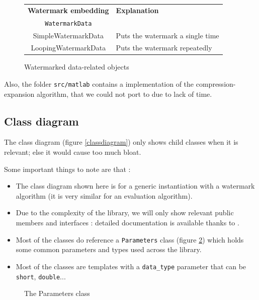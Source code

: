 \begin{figure}[h!]
\centering
\begin{tabular}{|c|l|}
\hline
\textbf{Watermark embedding} & \textbf{Explanation} \\
\texttt{WatermarkData} & \\
\hline
SimpleWatermarkData & Puts the watermark a single time \\   
LoopingWatermarkData & Puts the watermark repeatedly \\
\hline
\end{tabular}
\caption{Watermarked data-related objects}
\label{frameworkclass4}
\end{figure}

Also, the folder \texttt{src/matlab} contains a  implementation of the compression-expansion algorithm, that we could not port to  due to lack of time.

\newpage

\subsection{Class diagram}

The class diagram (figure \ref{classdiagram}) only shows child classes when it is relevant; else it would cause too much bloat.

Some important things to note are that :
\begin{itemize}
\item The class diagram shown here is for a generic instantiation with a watermark algorithm (it is very similar for an evaluation algorithm). 
\item Due to the complexity of the library, we will only show relevant public members and interfaces : detailed documentation is available thanks to .
\item Most of the classes do reference a \texttt{Parameters} class (figure \ref{parametersclass}) which holds some common parameters and types used across the library.
\item Most of the classes are templates with a \texttt{data\_type} parameter that can be \texttt{short}, \texttt{double}...
\end{itemize}


\begin{figure}[h!]
\centering
{}

\caption{The Parameters class}
\label{parametersclass}
\end{figure}

